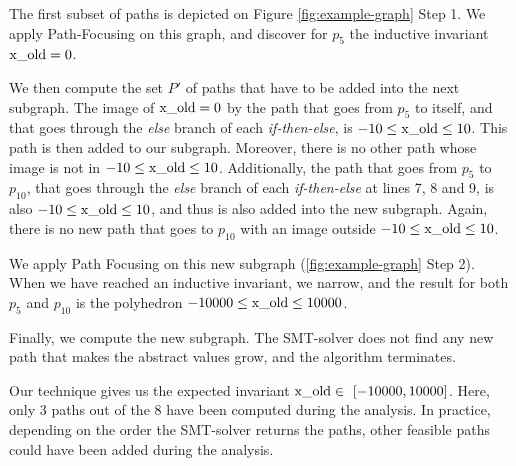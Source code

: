 \documentclass{llncs}
\begin{document}
\begin{compactenum}
	\item The first subset of paths is depicted on Figure
		\ref{fig:example-graph} Step 1. We apply Path-Focusing on this graph,
		and discover for $p_5$ the inductive invariant $\lstinline|x_old| = 0$.
	\item
		We then compute the set $P'$ of paths that have to be added into the
		next subgraph. 
		The image of $\lstinline|x_old| = 0$ by the path that goes from $p_5$ to
		itself, and that goes through the \emph{else} branch of each 
		\emph{if-then-else}, is $-10 \leq \lstinline|x_old| \leq 10$. This path
		is then added to our subgraph. Moreover, there is no other path whose
		image is not in $-10 \leq \lstinline|x_old| \leq 10$.
		Additionally, the path that goes from $p_5$ to
		$p_{10}$, that goes through the \emph{else} branch of each 
		\emph{if-then-else} at lines 7, 8 and 9, is also 
		$-10 \leq \lstinline|x_old| \leq 10$, and thus is also added into the
		new subgraph. Again, there is no new path that goes to $p_{10}$ with an
		image outside $-10 \leq \lstinline|x_old| \leq 10$.
	\item
		We apply Path Focusing on this new subgraph (\ref{fig:example-graph}
		Step 2). When we have reached an inductive invariant, we narrow, and the
		result for both $p_5$ and $p_{10}$ is the polyhedron 
		$-10000 \leq \lstinline|x_old| \leq 10000$.
	\item Finally, we compute the new subgraph. The SMT-solver does not find any
		new path that makes the abstract values grow, and the algorithm
		terminates.
\end{compactenum}

Our technique gives us the expected invariant 
$\lstinline|x_old| \in~[-10000,\allowbreak 10000]$. 
Here, only 3 paths out of the 8 have been computed during the analysis. In
practice, depending on the order the SMT-solver returns the paths, other
feasible paths could have been added during the analysis.
\end{document}
